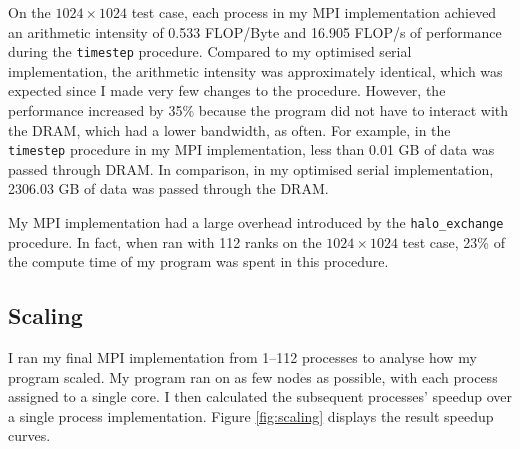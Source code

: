 \documentclass[twocolumn, a4paper]{article}
\begin{document}
On the $1024 \times 1024$ test case, each process in my MPI implementation achieved an arithmetic intensity of 0.533 FLOP/Byte and 16.905 FLOP/s of performance during the \texttt{timestep} procedure.
Compared to my optimised serial implementation, the arithmetic intensity was approximately identical, which was expected since I made very few changes to the procedure.
However, the performance increased by 35\% because the program did not have to interact with the DRAM, which had a lower bandwidth, as often.
For example, in the \texttt{timestep} procedure in my MPI implementation, less than 0.01 GB of data was passed through DRAM.
In comparison, in my optimised serial implementation, 2306.03 GB of data was passed through the DRAM.

My MPI implementation had a large overhead introduced by the \texttt{halo\_exchange} procedure.
In fact, when ran with 112 ranks on the $1024\times1024$ test case, 23\% of the compute time of my program was spent in this procedure.


\subsection{Scaling}

I ran my final MPI implementation from 1--112 processes to analyse how my program scaled.
My program ran on as few nodes as possible, with each process assigned to a single core. 
I then calculated the subsequent processes' speedup over a single process implementation.
Figure \ref{fig:scaling} displays the result speedup curves.
\end{document}
